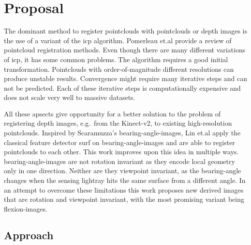 \documentclass[doktyp=marbeit,fontsize=12pt,sprache=english,draft=true,hausschrift=true]{TUBAFarbeiten}
\begin{document}
\maketitle

\TUBAFErklaerungsseite%
\tableofcontents
\newpage

\printglossary[type=\acronymtype]%
\newpage

\printglossary[type=symbols]%
\glsaddallunused[symbols]
\newpage


\section{Proposal}

The dominant method to register pointclouds with pointclouds or depth
images is the use of a variant of the \gls{icp}\cite{Besl1992}
algorithm. Pomerleau et.al\cite{Pomerleau2015} provide a review of pointcloud registration methods.
Even though there are many different variations of \gls{icp}, it has
some common problems. The algorithm requires a good initial
transformation. Pointclouds with order-of-magnitude different
resolutions can produce unstable results. Convergence might require many
iterative steps and can not be predicted. Each of these iterative steps
is computationally expensive and does not scale very well to massive
datasets.

All these apsects give opportunity for a better solution to the problem
of registering depth images, e.g.~from the Kinect-v2, to existing
high-resolution pointclouds.
Inspired by Scaramuzza's \Glspl{bearing-angle-image}\cite{Scaramuzza2007}, Lin et.al\cite{Lin2017} apply the classical feature detector \gls{surf}\cite{Bay2006} on \Glspl{bearing-angle-image} and are able to register pointclouds to each other.
This work improves upon this idea in multiple ways.
\Glspl{bearing-angle-image} are not rotation invariant as they encode local geometry only in one direction.
Neither are they viewpoint invariant, as the \gls{bearing-angle} changes when the sensing lightray hits the same surface from a different angle.
In an attempt to overcome these limitations this work proposes new derived images that are rotation and viewpoint invariant, with the most promising variant being \Glspl{flexion-image}.

\subsection{Approach}\label{approach}
\end{document}
